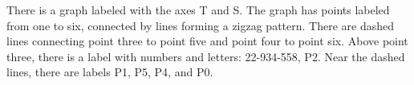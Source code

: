 There is a graph labeled with the axes T and S. The graph has points labeled from one to six, connected by lines forming a zigzag pattern. There are dashed lines connecting point three to point five and point four to point six. Above point three, there is a label with numbers and letters: 22-934-558, P2. Near the dashed lines, there are labels P1, P5, P4, and P0.